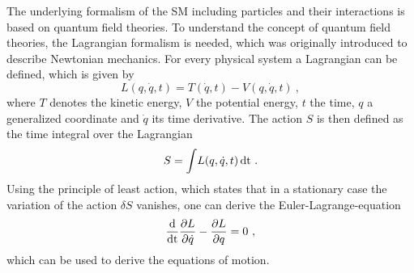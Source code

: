 \noindent The underlying formalism of the SM including particles and their interactions is based on quantum field theories. To understand the concept of quantum field theories, the Lagrangian formalism is needed, which was originally introduced to describe Newtonian mechanics. For every physical system a Lagrangian can be defined, which is given by
\begin{equation}
L(q,\dot{q},t) = T(\dot{q},t) - V(q,\dot{q},t) ~,
\end{equation}
where $T$ denotes the kinetic energy, $V$ the potential energy, $t$ the time, $q$ a generalized coordinate and $\dot{q}$ its time derivative. The action $S$ is then defined as the time integral over the Lagrangian
\begin{equation}
S = \int \! L(q,\dot{q},t) \, \rm{dt} ~.
\end{equation}
Using the principle of least action, which states that in a stationary case the variation of the action $\delta S$ vanishes, one can derive the Euler-Lagrange-equation
\begin{equation}
\frac{\rm{d}}{\rm{dt}}\frac{\partial L}{\partial \dot{q}} - \frac{\partial L}{\partial q} = 0 ~,
\end{equation}
which can be used to derive the equations of motion.\\

